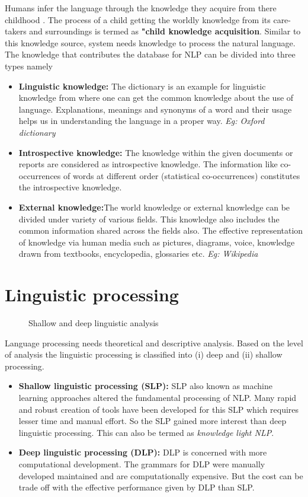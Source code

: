 \documentclass{bmcart}
\begin{document}
Humans infer the language through the knowledge they acquire from there childhood \cite{childknowledge}. The process of a child getting the worldly knowledge from its care-takers and surroundings is termed as \textbf{"child knowledge acquisition}. Similar to this knowledge source, system needs knowledge to process the natural language. The knowledge that contributes the database for NLP can be divided into three types namely
\begin{itemize}
\item \textbf{Linguistic knowledge:} The dictionary is an example for linguistic knowledge from where one can get the common knowledge about the use of language. Explanations, meanings and synonyms of a word and their usage helps us in understanding
the language in a proper way. \textit{Eg: Oxford dictionary}

\item \textbf{Introspective knowledge:} The knowledge within the given documents or reports are considered as introspective knowledge. The information like co-occurrences of words at different order (statistical co-occurrences) constitutes the introspective knowledge. 

\item \textbf{External knowledge:}The world knowledge or external knowledge can be divided under variety of various fields. This knowledge also includes the common information shared across the fields also. The effective representation of knowledge via human media such as pictures, diagrams, voice, knowledge drawn from textbooks, encyclopedia, glossaries etc. 
\textit{Eg: Wikipedia}
\end{itemize}

\section{Linguistic processing}
\label{sec:languageProcessing}

\begin{figure}
	\centering
	\caption{Shallow and deep linguistic analysis}
	\label{fig:morphology}
\end{figure}

Language processing needs theoretical and descriptive analysis. Based on the level of analysis the linguistic processing is classified into (i) deep and (ii) shallow processing. 
\begin{itemize}
\item \textbf{Shallow linguistic processing (SLP):} SLP also known as machine learning approaches altered the fundamental processing of NLP. Many rapid and robust creation of tools have been developed for this SLP which requires lesser time and manual effort. So the SLP gained more interest than deep linguistic processing. This can also be termed as \textit{knowledge light NLP}. 
\item \textbf{Deep linguistic processing (DLP):} DLP is concerned with more computational development. The grammars for DLP were manually developed maintained and are computationally expensive. But the cost can be trade off with the effective performance given by DLP than SLP. 
\end{itemize}
\end{document}
